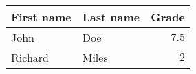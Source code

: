 \documentclass[utf8]{ctexart}
\begin{document}
\begin{tabular}{llr}
  \toprule
  First name & Last name & Grade \\
  \midrule
  John & Doe & $7.5$ \\
  \midrule
  Richard & Miles & $2$\\
  \bottomrule
\end{tabular}
\end{document}
